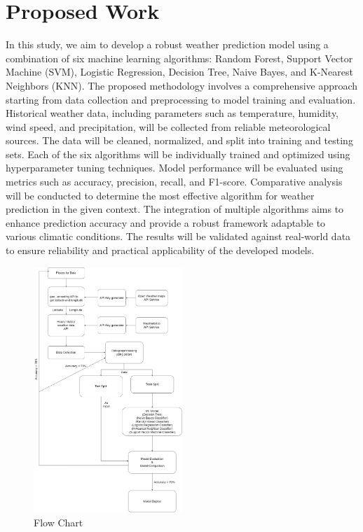 \documentclass[conference]{IEEEtran}
\begin{document}
\section{\textbf{Proposed Work}}
In this study, we aim to develop a robust weather prediction model using a combination of six machine learning algorithms: Random Forest, Support Vector Machine (SVM), Logistic Regression, Decision Tree, Naive Bayes, and K-Nearest Neighbors (KNN). The proposed methodology involves a comprehensive approach starting from data collection and preprocessing to model training and evaluation. Historical weather data, including parameters such as temperature, humidity, wind speed, and precipitation, will be collected from reliable meteorological sources. The data will be cleaned, normalized, and split into training and testing sets. Each of the six algorithms will be individually trained and optimized using hyperparameter tuning techniques. Model performance will be evaluated using metrics such as accuracy, precision, recall, and F1-score. Comparative analysis will be conducted to determine the most effective algorithm for weather prediction in the given context. The integration of multiple algorithms aims to enhance prediction accuracy and provide a robust framework adaptable to various climatic conditions. The results will be validated against real-world data to ensure reliability and practical applicability of the developed models.

\begin{figure}[htbp] %
    \centering
    \includegraphics[width=0.5\textwidth]{"../images/flow_chart.png"} %
    \caption{Flow Chart}
    \label{Flow Chart}
\end{figure}
\end{document}
